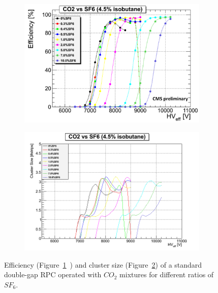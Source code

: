 	\begin{figure}[H]
		\begin{subfigure}{0.5\linewidth}
			\centering
			\includegraphics[width=\linewidth]{fig/chapt3/CO2-UGent.png}
			\caption{\label{fig:UGent-CO2:A}}
		\end{subfigure}
		\begin{subfigure}{0.5\linewidth}
			\centering
			\includegraphics[width=\linewidth]{fig/chapt3/CO2-CS-UGent.png}
			\caption{\label{fig:UGent-CO2:B}}
		\end{subfigure}
		\caption{\label{fig:UGent-CO2} Efficiency (Figure~\ref{fig:UGent-CO2:A}~\cite{PICCOLO2016}) and cluster size (Figure~\ref{fig:UGent-CO2:B}) of a standard double-gap RPC operated with $CO_2$ mixtures for different ratios of $SF_6$.}
	\end{figure}

\begingroup\setlength{\intextsep}{5pt}\setlength{\columnsep}{15pt}

